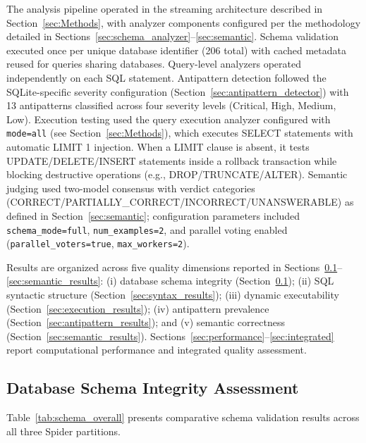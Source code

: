 \documentclass[]{einformatica}
\begin{document}
The analysis pipeline operated in the streaming architecture described in Section~\ref{sec:Methods}, with analyzer components configured per the methodology detailed in Sections~\ref{sec:schema_analyzer}--\ref{sec:semantic}. Schema validation executed once per unique database identifier (206 total) with cached metadata reused for queries sharing databases. Query-level analyzers operated independently on each SQL statement. Antipattern detection followed the SQLite-specific severity configuration (Section~\ref{sec:antipattern_detector}) with 13 antipatterns classified across four severity levels (Critical, High, Medium, Low). Execution testing used the query execution analyzer configured with \texttt{mode=all} (see Section~\ref{sec:Methods}), which executes SELECT statements with automatic LIMIT 1 injection. When a LIMIT clause is absent, it tests UPDATE/DELETE/INSERT statements inside a rollback transaction while blocking destructive operations (e.g., DROP/\allowbreak TRUNCATE/\allowbreak ALTER). Semantic judging used two-model consensus with verdict categories (CORRECT/\allowbreak PARTIALLY\_CORRECT/\allowbreak INCORRECT/\allowbreak UNANSWERABLE) as defined in Section~\ref{sec:semantic}; configuration parameters included \texttt{schema\_mode=full}, \texttt{num\_examples=2}, and parallel voting enabled (\texttt{parallel\_voters=true}, \texttt{max\_workers=2}).

Results are organized across five quality dimensions reported in Sections~\ref{sec:schema_results}--\ref{sec:semantic_results}: (i) database schema integrity (Section~\ref{sec:schema_results}); (ii) SQL syntactic structure (Section~\ref{sec:syntax_results}); (iii) dynamic executability (Section~\ref{sec:execution_results}); (iv) antipattern prevalence (Section~\ref{sec:antipattern_results}); and (v) semantic correctness (Section~\ref{sec:semantic_results}). Sections~\ref{sec:performance}--\ref{sec:integrated} report computational performance and integrated quality assessment.

\subsection{Database Schema Integrity Assessment}\label{sec:schema_results}

Table~\ref{tab:schema_overall} presents comparative schema validation results across all three Spider partitions.
\end{document}
